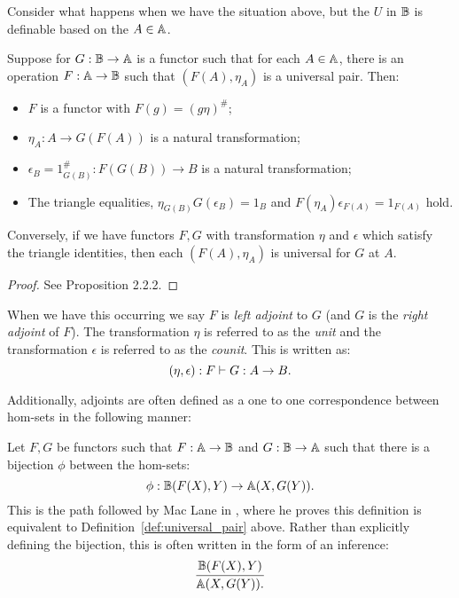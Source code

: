 Consider what happens when we have the situation above, but the $U$ in $\mathbb{B}$ is definable
based on the $A\in\mathbb{A}$.
\begin{lemma}\label{lem:adjoint-setup}
  Suppose for $G:\mathbb{B}\to\mathbb{A}$ is a functor such that for each $A\in\mathbb{A}$, there is an operation
  $F:\mathbb{A}\to\mathbb{B}$ such that  $(F(A),\eta_A)$ is a universal pair. Then:
  \begin{itemize}
    \item $F$ is a functor with $F(g) = (g\eta)^{\#}$;
    \item $\eta_A: A \to G(F(A))$ is a natural transformation;
    \item $\epsilon_B = 1_{G(B)}^{\#}:F(G(B)) \to B$ is a natural transformation;
    \item The triangle equalities, $\eta_{G(B)}G(\epsilon_B) = 1_B$ and $F(\eta_A)\epsilon_{F(A)} =
      1_{F(A)}$ hold.
  \end{itemize}
  Conversely, if we have functors $F,G$ with transformation $\eta$ and $\epsilon$ which satisfy the
  triangle identities, then each $(F(A),\eta_A)$ is universal for $G$ at $A$.
\end{lemma}
\begin{proof}
  See Proposition 2.2.2\cite{cockett2009:ctcs}.
\end{proof}

When we have this occurring we say $F$ is \emph{left adjoint} to $G$ (and $G$ is the
\emph{right adjoint} of $F$). The transformation $\eta$ is referred to as the \emph{unit} and the
transformation $\epsilon$ is referred to as the \emph{counit}. This is written as:
\[
  (\eta,\epsilon):F\vdash G:A\to B.
\]

Additionally, adjoints are often defined as a one to one correspondence between hom-sets in the
following manner:

Let $F,G$ be functors such that $F:\mathbb{A} \to \mathbb{B}$ and $G:\mathbb{B} \to \mathbb{A}$ such that there is a bijection $\phi$
between the hom-sets:
\[
  \phi: \mathbb{B}(F(X),Y) \to \mathbb{A}(X,G(Y)).
\]
This is the path followed by Mac Lane in \cite{maclan97:categorieswrkmath}, where he proves this
definition is equivalent to Definition~\ref{def:universal_pair} above. Rather than explicitly
defining the bijection, this is often written in the form of an inference:
\[
  \infer{\A(X,G(Y)).}{\B(F(X),Y)}
\]



